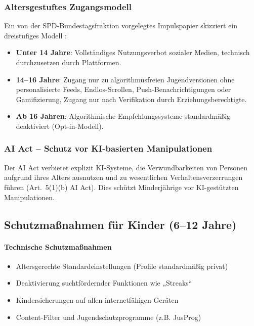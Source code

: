 \documentclass[11pt,a4paper]{article}
\begin{document}
	\subsubsection{Altersgestuftes Zugangsmodell}
	Ein von der SPD-Bundestagsfraktion vorgelegtes Impulspapier skizziert ein dreistufiges Modell \cite{dataagenda2026}:
	\begin{itemize}
		\item \textbf{Unter 14 Jahre}: Vollständiges Nutzungsverbot sozialer Medien, technisch durchzusetzen durch Plattformen.
		\item \textbf{14--16 Jahre}: Zugang nur zu algorithmusfreien Jugendversionen ohne personalisierte Feeds, Endlos-Scrollen, Push-Benachrichtigungen oder Gamifizierung, Zugang nur nach Verifikation durch Erziehungsberechtigte.
		\item \textbf{Ab 16 Jahren}: Algorithmische Empfehlungssysteme standardmäßig deaktiviert (Opt-in-Modell).
	\end{itemize}
	
	\subsubsection{AI Act -- Schutz vor KI-basierten Manipulationen}
	Der AI Act verbietet explizit KI-Systeme, die Verwundbarkeiten von Personen aufgrund ihres Alters ausnutzen und zu wesentlichen Verhaltensverzerrungen führen (Art.~5(1)(b) AI Act). Dies schützt Minderjährige vor KI-gestützten Manipulationen.
	
	\subsection{Schutzmaßnahmen für Kinder (6--12 Jahre)}
	
	\paragraph{Technische Schutzmaßnahmen}
	\begin{itemize}
		\item Altersgerechte Standardeinstellungen (Profile standardmäßig privat)
		\item Deaktivierung suchtfördernder Funktionen wie „Streaks“
		\item Kindersicherungen auf allen internetfähigen Geräten
		\item Content-Filter und Jugendschutzprogramme (z.B. JusProg) \cite{telekom}
	\end{itemize}
	
\end{document}
